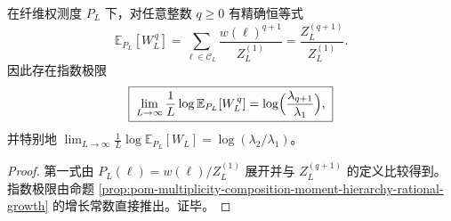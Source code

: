 \begin{proposition}[纤维权测度下的矩移位律]\label{prop:pom-multiplicity-composition-moment-shift-law}
在纤维权测度 \(P_L\) 下，对任意整数 \(q\ge 0\) 有精确恒等式
\[
\boxed{\;
\mathbb{E}_{P_L}[W_L^{\,q}]
=\sum_{\boldsymbol{\ell}\in\mathcal{C}_L}\frac{w(\boldsymbol{\ell})^{q+1}}{Z_L^{(1)}}
=\frac{Z_L^{(q+1)}}{Z_L^{(1)}}.\;}
\]
因此存在指数极限
\[
\boxed{\;
\lim_{L\to\infty}\frac{1}{L}\log \mathbb{E}_{P_L}[W_L^{\,q}]
=\log\Bigl(\frac{\lambda_{q+1}}{\lambda_1}\Bigr),\;}
\]
并特别地
\(
\lim_{L\to\infty}\frac{1}{L}\log \mathbb{E}_{P_L}[W_L]=\log(\lambda_2/\lambda_1)
\)。
\end{proposition}
\begin{proof}
第一式由 \(P_L(\boldsymbol{\ell})=w(\boldsymbol{\ell})/Z_L^{(1)}\) 展开并与 \(Z_L^{(q+1)}\) 的定义比较得到。
指数极限由命题 \ref{prop:pom-multiplicity-composition-moment-hierarchy-rational-growth} 的增长常数直接推出。证毕。
\end{proof}

